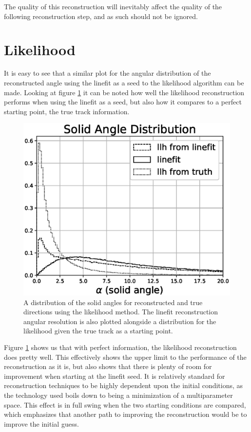 The quality of this reconstruction will inevitably affect the quality of the following reconstruction step, and as such should not be ignored. 

\section{Likelihood}

It is easy to see that a similar plot for the angular distribution of the reconstructed angle using the linefit as a seed to the likelihood algorithm can be made. Looking at figure \ref{fig:alpha_llh} it can be noted how well the likelihood reconstruction performs when using the linefit as a seed, but also how it compares to a perfect starting point, the true track information.

\begin{figure}[H]
  \centering
  \includegraphics[width=12cm]{./Figures/reco_plots/alpha_dist_llh_norm.eps}
  \caption{A distribution of the solid angles for reconstructed and true directions using the likelihood method. The linefit reconstruction angular resolution is also plotted alongside a distribution for the likelihood given the true track as a starting point.}
  \label{fig:alpha_llh}
\end{figure}

Figure \ref{fig:alpha_llh} shows us that with perfect information, the likelihood reconstruction does pretty well. This effectively shows the upper limit to the performance of the reconstruction as it is, but also shows that there is plenty of room for improvement when starting at the linefit seed. It is relatively standard for reconstruction techniques to be highly dependent upon the initial conditions, as the technology used boils down to being a minimization of a multiparameter space. This effect is in full swing when the two starting conditions are compared, which emphasizes that another path to improving the reconstruction would be to improve the initial guess.

